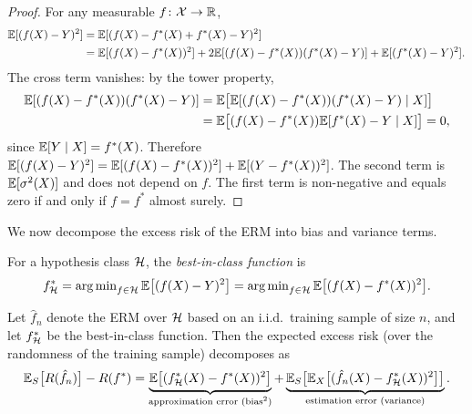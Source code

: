 \documentclass[11pt,a4paper]{article}
\begin{document}
\begin{proof}
For any measurable $f \colon \mathcal{X} \to \mathbb{R}$,
\begin{align*}
    \mathbb{E}[(f(X) - Y)^2]
    &= \mathbb{E}[(f(X) - f^*(X) + f^*(X) - Y)^2] \\
    &= \mathbb{E}[(f(X) - f^*(X))^2]
    + 2\mathbb{E}[(f(X) - f^*(X))(f^*(X) - Y)]
    + \mathbb{E}[(f^*(X) - Y)^2].
\end{align*}
The cross term vanishes: by the tower property,
\begin{align*}
    \mathbb{E}[(f(X) - f^*(X))(f^*(X) - Y)]
    &= \mathbb{E}\bigl[\mathbb{E}[(f(X) - f^*(X))(f^*(X) - Y) \mid X]\bigr] \\
    &= \mathbb{E}\bigl[(f(X) - f^*(X)) \mathbb{E}[f^*(X) - Y \mid X]\bigr]
    = 0,
\end{align*}
since $\mathbb{E}[Y \mid X] = f^*(X)$.  Therefore
$\mathbb{E}[(f(X) - Y)^2] = \mathbb{E}[(f(X) - f^*(X))^2] + \mathbb{E}[(Y - f^*(X))^2]$.
The second term is $\mathbb{E}[\sigma^2(X)]$ and does not depend on $f$.
The first term is non-negative and equals zero if and only if
$f = f^*$ almost surely.
\end{proof}

We now decompose the excess risk of the ERM into bias and variance
terms.

\begin{definition}
\label{def:best_in_class}
For a hypothesis class $\mathcal{H}$, the \emph{best-in-class
function} is
\[
    f_{\mathcal{H}}^* = \operatorname{arg\,min}_{f \in \mathcal{H}}
    \mathbb{E}\bigl[(f(X) - Y)^2\bigr]
    = \operatorname{arg\,min}_{f \in \mathcal{H}}
    \mathbb{E}\bigl[(f(X) - f^*(X))^2\bigr].
\]
\end{definition}

\begin{theorem}
\label{thm:bias_variance}
Let $\hat{f}_n$ denote the ERM over $\mathcal{H}$ based on an i.i.d.\
training sample of size $n$, and let $f_{\mathcal{H}}^*$ be the
best-in-class function.  Then the expected excess risk (over the
randomness of the training sample) decomposes as
\[
    \mathbb{E}_S\bigl[R(\hat{f}_n)\bigr] - R(f^*)
    = \underbrace{\mathbb{E}\bigl[(f_{\mathcal{H}}^*(X) - f^*(X))^2\bigr]}_{
    \text{approximation error (bias}^2\text{)}}
    + \underbrace{\mathbb{E}_S\bigl[\mathbb{E}_X\bigl[
    (\hat{f}_n(X) - f_{\mathcal{H}}^*(X))^2\bigr]\bigr]}_{
    \text{estimation error (variance)}}.
\]
\end{theorem}
\end{document}

